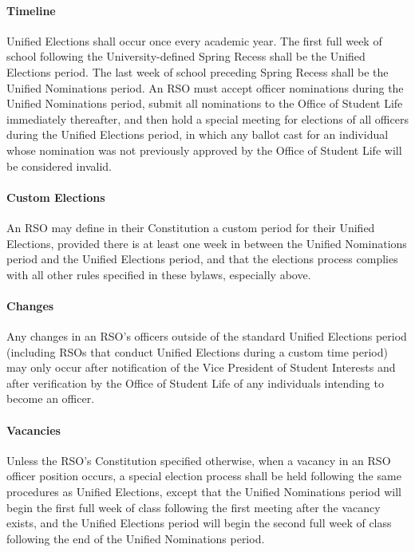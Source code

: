 \documentclass[12pt]{scrreprt}
\begin{document}
\paragraph{Timeline}
Unified Elections shall occur once every academic year. The first full
week of school following the University-defined Spring Recess shall be
the Unified Elections period. The last week of school preceding Spring
Recess shall be the Unified Nominations period. An RSO must accept
officer nominations during the Unified Nominations period, submit all
nominations to the Office of Student Life immediately thereafter, and
then hold a special meeting for elections of all officers during the
Unified Elections period, in which any ballot cast for an individual
whose nomination was not previously approved by the Office of Student
Life will be considered invalid.

\paragraph{Custom Elections}
An RSO may define in their Constitution a custom period for their
Unified Elections, provided there is at least one week in between the
Unified Nominations period and the Unified Elections period, and that
the elections process complies with all other rules specified in these
bylaws, especially above.

\paragraph{Changes}
Any changes in an RSO’s officers outside of the standard Unified
Elections period (including RSOs that conduct Unified Elections during
a custom time period) may only occur after notification of the Vice President of Student Interests and after verification by the Office of Student Life of any individuals intending to become an officer.

\paragraph{Vacancies}
Unless the RSO’s Constitution specified otherwise, when a vacancy in
an RSO officer position occurs, a special election process shall be
held following the same procedures as Unified Elections, except that
the Unified Nominations period will begin the first full week of class
following the first meeting after the vacancy exists, and the Unified
Elections period will begin the second full week of class following
the end of the Unified Nominations period.
\end{document}
